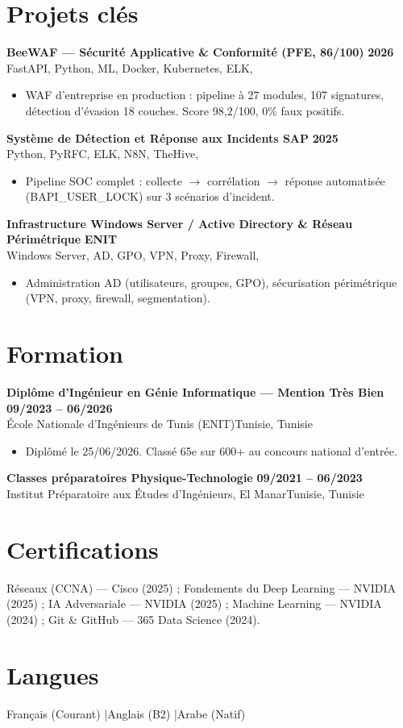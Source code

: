 \documentclass[a4paper,9pt]{article}
\newcommand{\cventry}[4]{\textbf{#1} \hfill \textbf{#4}\\[0.2pt]#2{\ifx\relax#3\relax\else, #3\fi}\par\vspace{0.3pt}}
\begin{document}
\section{Projets clés}
\cventry{BeeWAF --- Sécurité Applicative \& Conformité (PFE, 86/100)}{FastAPI, Python, ML, Docker, Kubernetes, ELK}{}{2026}
\begin{itemize}
  \item WAF d'entreprise en production : pipeline à 27 modules, 107 signatures, détection d'évasion 18 couches. Score 98,2/100, 0\% faux positifs.
\end{itemize}
\cventry{Système de Détection et Réponse aux Incidents SAP}{Python, PyRFC, ELK, N8N, TheHive}{}{2025}
\begin{itemize}
  \item Pipeline SOC complet : collecte $\to$ corrélation $\to$ réponse automatisée (BAPI\_USER\_LOCK) sur 3 scénarios d'incident.
\end{itemize}
\cventry{Infrastructure Windows Server / Active Directory \& Réseau Périmétrique}{Windows Server, AD, GPO, VPN, Proxy, Firewall}{}{ENIT}
\begin{itemize}
  \item Administration AD (utilisateurs, groupes, GPO), sécurisation périmétrique (VPN, proxy, firewall, segmentation).
\end{itemize}
\section{Formation}
\cventry{Diplôme d'Ingénieur en Génie Informatique --- Mention Très Bien}{École Nationale d'Ingénieurs de Tunis (ENIT)}{Tunisie}{09/2023 -- 06/2026}
\begin{itemize}
  \item Diplômé le 25/06/2026. Classé 65e sur 600+ au concours national d'entrée.
\end{itemize}
\cventry{Classes préparatoires Physique-Technologie}{Institut Préparatoire aux Études d'Ingénieurs, El Manar}{Tunisie}{09/2021 -- 06/2023}
\section{Certifications}
Réseaux (CCNA) --- Cisco (2025) ; Fondements du Deep Learning --- NVIDIA (2025) ; IA Adversariale --- NVIDIA (2025) ; Machine Learning --- NVIDIA (2024) ; Git \& GitHub --- 365 Data Science (2024).
\section{Langues}
Français (Courant) \quad|\quad Anglais (B2) \quad|\quad Arabe (Natif)
\end{document}
